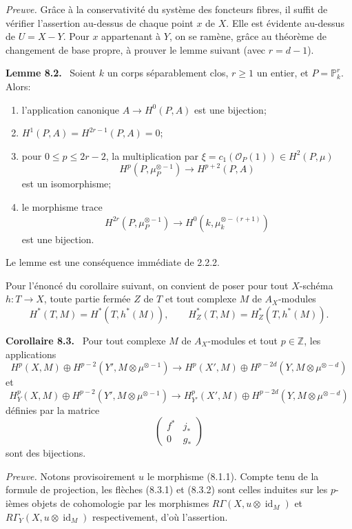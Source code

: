 \documentclass[11pt]{article}
\newenvironment{statement}[1]{\par\medskip\noindent\textbf{#1.}\ }{\par\medskip}
\begin{document}
\emph{Preuve.} Grâce à la conservativité du système des foncteurs fibres, il suffit de vérifier l'assertion au-dessus de chaque point $x$ de $X$. Elle est évidente au-dessus de $U=X-Y$. Pour $x$ appartenant à $Y$, on se ramène, grâce au théorème de changement de base propre, à prouver le lemme suivant (avec $r=d-1$).

\begin{statement}{Lemme 8.2}
Soient $k$ un corps séparablement clos, $r\ge1$ un entier, et $P=\mathbb P_k^r$. Alors:
\begin{enumerate}[label=\alph*)]
\item l'application canonique $A\to H^0(P,A)$ est une bijection;
\item $H^1(P,A)=H^{2r-1}(P,A)=0$;
\item pour $0\le p\le2r-2$, la multiplication par $\xi=c_1(\mathcal O_P(1))\in H^2(P,\mu)$
\[
H^p(P,\mu_P^{\otimes -1})\to H^{p+2}(P,A)
\]
est un isomorphisme;
\item le morphisme trace
\[
H^{2r}(P,\mu_P^{\otimes -1})\to H^0(k,\mu_k^{\otimes -(r+1)})
\]
est une bijection.
\end{enumerate}
\end{statement}

Le lemme est une conséquence immédiate de 2.2.2.

Pour l'énoncé du corollaire suivant, on convient de poser pour tout $X$-schéma $h:T\to X$, toute partie fermée $Z$ de $T$ et tout complexe $M$ de $A_X$-modules
\[
H^*(T,M)=H^*(T,h^*(M)),\qquad
H^*_Z(T,M)=H^*_Z(T,h^*(M)).
\]

\begin{statement}{Corollaire 8.3}
Pour tout complexe $M$ de $A_X$-modules et tout $p\in\mathbb Z$, les applications
\[
H^p(X,M)\oplus H^{p-2}(Y',M\otimes\mu^{\otimes -1})
\to
H^p(X',M)\oplus H^{p-2d}(Y,M\otimes\mu^{\otimes -d})
\tag{8.3.1}
\]
et
\[
H_Y^p(X,M)\oplus H^{p-2}(Y',M\otimes\mu^{\otimes -1})
\to
H_{Y'}^p(X',M)\oplus H^{p-2d}(Y,M\otimes\mu^{\otimes -d})
\tag{8.3.2}
\]
définies par la matrice
\[
\begin{pmatrix}
f^*&j_*\\
0&g_*
\end{pmatrix}
\]
sont des bijections.
\end{statement}

\emph{Preuve.} Notons provisoirement $u$ le morphisme (8.1.1). Compte tenu de la formule de projection, les flèches (8.3.1) et (8.3.2) sont celles induites sur les $p$-ièmes objets de cohomologie par les morphismes $R\Gamma(X,u\otimes\operatorname{id}_M)$ et $R\Gamma_Y(X,u\otimes\operatorname{id}_M)$ respectivement, d'où l'assertion.
\end{document}
